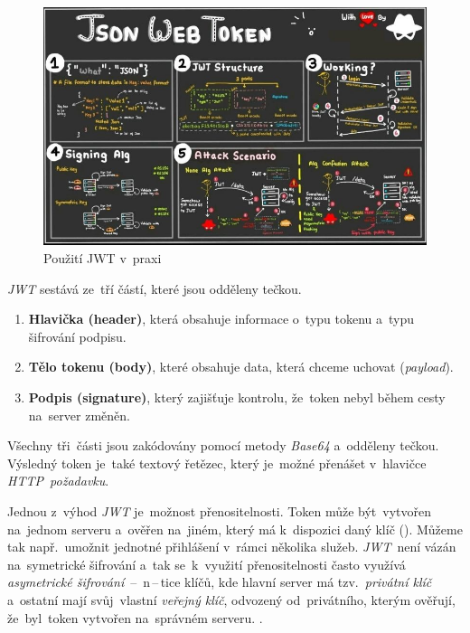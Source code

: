 \documentclass[10pt,a4paper]{article}
\begin{document}
                \begin{figure}
                    \centering
                    \includegraphics[width=.8\linewidth]{img/jwt.jpg}
                    \caption{Použití JWT v~praxi}
                    \label{model-jwt}
                \end{figure}

                \emph{JWT} sestává ze~tří částí, které jsou odděleny tečkou.
                
                \begin{enumerate}
                    \item \textbf{Hlavička (header)}, která obsahuje informace o~typu tokenu a~typu šifrování podpisu.
                    \item \textbf{Tělo tokenu (body)}, které obsahuje data, která chceme uchovat (\emph{payload}).
                    \item \textbf{Podpis (signature)}, který zajišťuje kontrolu, že~token nebyl během cesty na~server změněn.
                \end{enumerate}

                Všechny tři~části jsou zakódovány pomocí metody \emph{Base64} a~odděleny tečkou. Výsledný token je~také textový řetězec, který je~možné přenášet v~hlavičce \emph{HTTP~požadavku}.

                Jednou z~výhod \emph{JWT} je~možnost přenositelnosti. Token může být~vytvořen na~jednom serveru a~ověřen na~jiném, který má k~dispozici daný klíč (\cite{ieee:jwt}). Můžeme tak např.~umožnit jednotné přihlášení v~rámci několika služeb. \emph{JWT}~není vázán na~symetrické šifrování a~tak se~k~využití přenositelnosti často využívá \emph{asymetrické šifrování}~--~n\,--\,tice klíčů, kde hlavní server má tzv.~\emph{privátní klíč} a~ostatní mají svůj~vlastní \emph{veřejný klíč}, odvozený od~privátního, kterým ověřují, že~byl~token vytvořen na~správném serveru. \cite{miguelgrinbergJSONTokens}.
                
\end{document}
